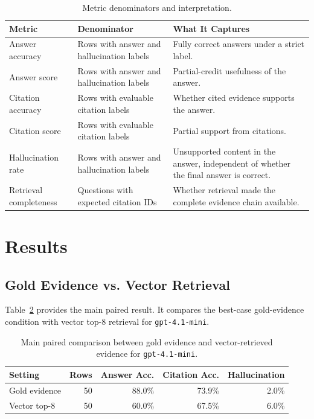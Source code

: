 \documentclass[10pt,twocolumn]{article}
\begin{document}
\begin{table}[t]
\centering
\small
\begin{tabular}{p{}p{}p{}}
\toprule
\textbf{Metric} & \textbf{Denominator} & \textbf{What It Captures} \\
\midrule
Answer accuracy & Rows with answer and hallucination labels & Fully correct answers under a strict label. \\
Answer score & Rows with answer and hallucination labels & Partial-credit usefulness of the answer. \\
Citation accuracy & Rows with evaluable citation labels & Whether cited evidence supports the answer. \\
Citation score & Rows with evaluable citation labels & Partial support from citations. \\
Hallucination rate & Rows with answer and hallucination labels & Unsupported content in the answer, independent of whether the final answer is correct. \\
Retrieval completeness & Questions with expected citation IDs & Whether retrieval made the complete evidence chain available. \\
\bottomrule
\end{tabular}
\caption{Metric denominators and interpretation.}
\label{tab:metric-denominators}
\end{table}

\section{Results}

\subsection{Gold Evidence vs. Vector Retrieval}

Table~\ref{tab:gold-vector} provides the main paired result. It compares the best-case gold-evidence condition with vector top-8 retrieval for \texttt{gpt-4.1-mini}.

\begin{table}[t]
\centering
\small
\begin{tabular}{lrrrr}
\toprule
\textbf{Setting} & \textbf{Rows} & \textbf{Answer Acc.} & \textbf{Citation Acc.} & \textbf{Hallucination} \\
\midrule
Gold evidence & 50 & 88.0\% & 73.9\% & 2.0\% \\
Vector top-8 & 50 & 60.0\% & 67.5\% & 6.0\% \\
\bottomrule
\end{tabular}
\caption{Main paired comparison between gold evidence and vector-retrieved evidence for \texttt{gpt-4.1-mini}.}
\label{tab:gold-vector}
\end{table}
\end{document}
